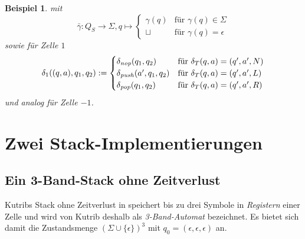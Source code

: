 \documentclass{article}
\newcounter{ctr}
\newtheorem{beispiel}[ctr]{Beispiel}
\begin{document}
\begin{beispiel}
    mit
    \[ \bar\gamma : Q_S \rightarrow \Sigma, q \mapsto \begin{cases}
            \gamma(q) &\text{für } \gamma(q) \in \Sigma \\
            \sqcup &\text{für } \gamma(q) = \epsilon
    \end{cases} \]
    sowie für Zelle $1$
    \[ \delta_1((q, a), q_1, q_2) :=
        \begin{cases}
            \delta_{\mathit{nop}}(q_1, q_2) &\text{für } \delta_T(q, a) = (q', a', N) \\
            \delta_{\mathit{push}}(a', q_1, q_2) &\text{für } \delta_T(q, a) = (q', a', L) \\
            \delta_{\mathit{pop}}(q_1, q_2) &\text{für } \delta_T(q, a) = (q', a', R) \\
    \end{cases} \]
    und analog für Zelle $-1$.
\end{beispiel}

\section{Zwei Stack-Implementierungen}

\subsection{Ein 3-Band-Stack ohne Zeitverlust}

Kutribs Stack ohne Zeitverlust in \cite{kutrib08} speichert bis zu drei Symbole in \emph{Registern} einer Zelle und wird von Kutrib deshalb als \emph{3-Band-Automat} bezeichnet. Es bietet sich damit die Zustandsmenge $(\Sigma \cup \{\epsilon\})^3$ mit $q_0 = (\epsilon,\epsilon,\epsilon)$ an.
\end{document}
